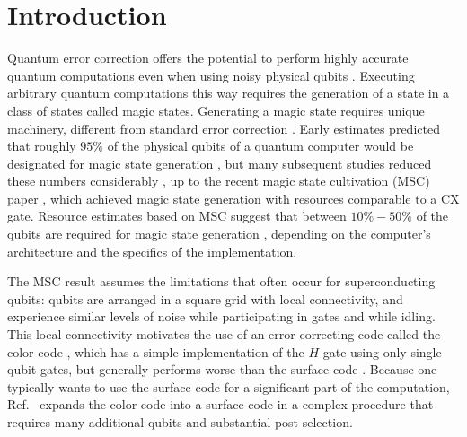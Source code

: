 \documentclass[twocolumn,notitlepage,nofootinbib,floatfix,superscriptaddress]{revtex4-1}
\begin{document}
\section{Introduction}

Quantum error correction offers the potential to perform highly accurate quantum computations even when using noisy physical qubits \cite{aharonov1997fault,knill1998resilient}. Executing arbitrary quantum computations this way requires the generation of a state in a class of states called magic states. Generating a magic state requires unique machinery, different from standard error correction \cite{eastin2009restrictions, lao2022magic, gidney2023cleaner, bravyi2012magic, litinski2019magic}. Early estimates predicted that roughly $95\%$ of the physical qubits of a quantum computer would be designated for magic state generation \cite{Fowler_2012}, but many subsequent studies reduced these numbers considerably \cite{dennis2001toward, goto2014step, goto2016minimizing, chamberland2020very, itogawa2024even,hirano2024leveraging, gupta2024encoding}, up to the recent magic state cultivation (MSC) paper \cite{gidney2024magic}, which achieved magic state generation with resources comparable to a CX gate. Resource estimates based on MSC suggest that between $10\%-50\%$ of the qubits are required for magic state generation \cite{gidney2025factor, zhou2025resource}, depending on the computer's architecture and the specifics of the implementation.

The MSC result assumes the limitations that often occur for superconducting qubits: qubits are arranged in a square grid with local connectivity, and experience similar levels of noise while participating in gates and while idling. This local connectivity motivates the use of an error-correcting code called the color code \cite{bombin2006topological, kubica2015unfolding, gidney2312new}, which has a simple implementation of the $H$ gate using only single-qubit gates, but generally performs worse than the surface code \cite{kitaev2003fault, Fowler_2012}. Because one typically wants to use the surface code for a significant part of the computation, Ref.~\cite{gidney2024magic} expands the color code into a surface code in a complex procedure that requires many additional qubits and substantial post-selection.
\end{document}
